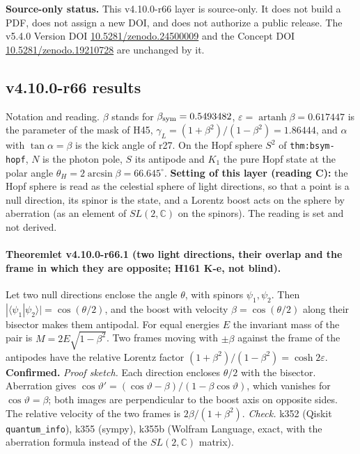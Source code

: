 \noindent\textbf{Source-only status.}
This v4.10.0-r66 layer is source-only.  It does not build a PDF, does not assign a new DOI,
and does not authorize a public release.  The v5.4.0 Version DOI
\href{https://doi.org/10.5281/zenodo.24500009}{10.5281/zenodo.24500009} and the Concept DOI
\href{https://doi.org/10.5281/zenodo.19210728}{10.5281/zenodo.19210728} are unchanged by it.

\subsection*{v4.10.0-r66 results}
\label{subsec:v4100-r66-results}

Notation and reading.  \(\beta\) stands for \(\beta_{\rm sym}=0.5493482\), \(\varepsilon=\operatorname{artanh}\beta=0.617447\) is the parameter of the
mask of H45, \(\gamma_L=(1+\beta^2)/(1-\beta^2)=1.86444\), and \(\alpha\) with \(\tan\alpha=\beta\) is the kick angle of r27.  On the Hopf sphere
\(S^2\) of \texttt{thm:bsym-hopf}, \(N\) is the photon pole, \(S\) its antipode and \(K_1\) the pure Hopf state at the polar angle
\(\theta_H=2\arcsin\beta=66.645^\circ\).  \textbf{Setting of this layer (reading C):} the Hopf sphere is read as the celestial sphere of light
directions, so that a point is a null direction, its spinor is the state, and a Lorentz boost acts on the sphere by aberration (as an element of
\(SL(2,\mathbb C)\) on the spinors).  The reading is set and not derived.

\paragraph{Theoremlet v4.10.0-r66.1 (two light directions, their overlap and the frame in which they are opposite; H161 K-e, not blind).}
Let two null directions enclose the angle \(\theta\), with spinors \(\psi_1,\psi_2\).  Then \(|\langle\psi_1|\psi_2\rangle|=\cos(\theta/2)\), and the
boost with velocity \(\beta=\cos(\theta/2)\) along their bisector makes them antipodal.  For equal energies \(E\) the invariant mass of the pair is
\(M=2E\sqrt{1-\beta^2}\).  Two frames moving with \(\pm\beta\) against the frame of the antipodes have the relative Lorentz factor
\((1+\beta^2)/(1-\beta^2)=\cosh2\varepsilon\).  \textbf{Confirmed.}
\emph{Proof sketch.}  Each direction encloses \(\theta/2\) with the bisector.  Aberration gives \(\cos\vartheta'=(\cos\vartheta-\beta)/(1-\beta\cos\vartheta)\),
which vanishes for \(\cos\vartheta=\beta\); both images are perpendicular to the boost axis on opposite sides.  The relative velocity of the two
frames is \(2\beta/(1+\beta^2)\).
\emph{Check.} k352 (Qiskit \texttt{quantum\_info}), k355 (sympy), k355b (Wolfram Language, exact, with the aberration formula instead of the
\(SL(2,\mathbb C)\) matrix).

